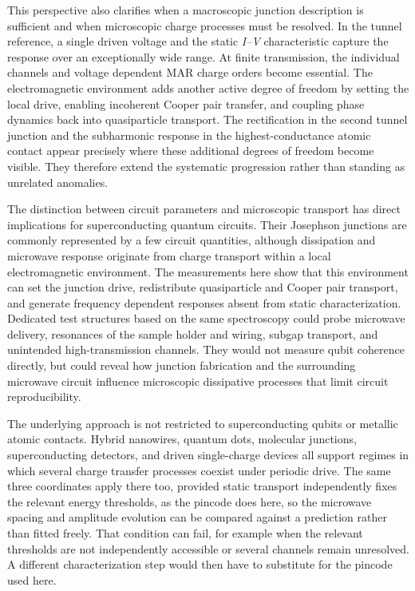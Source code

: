         This perspective also clarifies when a macroscopic junction description is sufficient and when microscopic charge processes must be resolved. In the tunnel reference, a single driven voltage and the static \textit{I--V} characteristic capture the response over an exceptionally wide range. At finite transmission, the individual channels and voltage dependent MAR charge orders become essential. The electromagnetic environment adds another active degree of freedom by setting the local drive, enabling incoherent Cooper pair transfer, and coupling phase dynamics back into quasiparticle transport. The rectification in the second tunnel junction and the subharmonic response in the highest-conductance atomic contact appear precisely where these additional degrees of freedom become visible. They therefore extend the systematic progression rather than standing as unrelated anomalies.

        The distinction between circuit parameters and microscopic transport has direct implications for superconducting quantum circuits. Their Josephson junctions are commonly represented by a few circuit quantities, although dissipation and microwave response originate from charge transport within a local electromagnetic environment. The measurements here show that this environment can set the junction drive, redistribute quasiparticle and Cooper pair transport, and generate frequency dependent responses absent from static characterization. Dedicated test structures based on the same spectroscopy could probe microwave delivery, resonances of the sample holder and wiring, subgap transport, and unintended high-transmission channels. They would not measure qubit coherence directly, but could reveal how junction fabrication and the surrounding microwave circuit influence microscopic dissipative processes that limit circuit reproducibility.

        The underlying approach is not restricted to superconducting qubits or metallic atomic contacts. Hybrid nanowires, quantum dots, molecular junctions, superconducting detectors, and driven single-charge devices all support regimes in which several charge transfer processes coexist under periodic drive. The same three coordinates apply there too, provided static transport independently fixes the relevant energy thresholds, as the pincode does here, so the microwave spacing and amplitude evolution can be compared against a prediction rather than fitted freely. That condition can fail, for example when the relevant thresholds are not independently accessible or several channels remain unresolved. A different characterization step would then have to substitute for the pincode used here.

